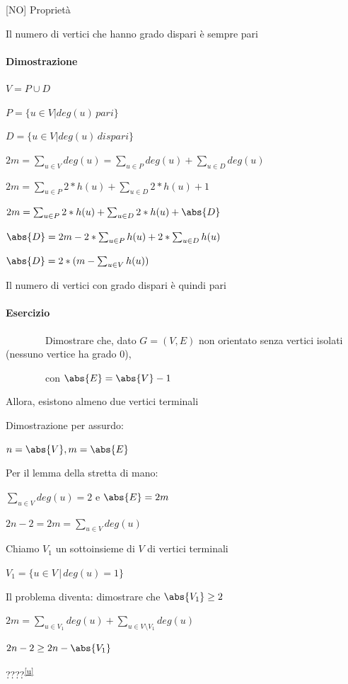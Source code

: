{{[}NO{]} Proprietà}

{Il numero di vertici che hanno grado dispari è sempre pari}

\paragraph{Dimostrazione}

$V=P\cup D$

$P = \{u \in V | deg(u) \, pari\}$

$D = \{u \in V | deg(u) \, dispari\}$

$2m = \sum_{u \in V}{deg(u)} = \sum_{u \in P}{deg(u)} + \sum_{u \in D}{deg(u)}$

$2m = \sum_{u \in P}{2*h(u)} + \sum_{u \in D}{2*h(u)+1}$

$2m = \sum_{u \in P}{2*h(u)} + \sum_{u \in D}{2*h(u)} + \abs{D}$

$\abs{D} = 2m - 2 *\sum_{u \in P}{h(u)} + 2*\sum_{u \in D}{h(u)}$

$\abs{D} = 2*(m-\sum_{u \in V}{h(u)})$

{Il numero di vertici con grado dispari è quindi pari}

\paragraph{Esercizio}
{~~~~~~~~Dimostrare che, dato $G=(V,E)$ non orientato senza vertici isolati (nessuno vertice ha grado 0),}

{~~~~~~~~con $\abs{E} = \abs{V} -1$}

{Allora, esistono almeno due vertici terminali}

{Dimostrazione per assurdo:}

$n=\abs{V},m=\abs{E}$

{Per il lemma della stretta di mano:}

$\sum_{u \in V}{deg(u)} = 2$ e $\abs{E} = 2m$

$2n-2 = 2m = \sum_{u \in V}{deg(u)}$

{Chiamo $V_1$ un sottoinsieme di $V$ di vertici terminali}

$V_1=\{u\in V\,|\,deg(u)=1\}$

{Il problema diventa: dimostrare che $\abs{V_1} \geq 2$}

$2m = \sum_{u \in V_1}{deg(u)} +  \sum_{u \in V \setminus V_1}{deg(u)}$

$2n -2 \geq 2n - \abs{V_1}$

{????}\textsuperscript{\protect\hyperlink{cmnt21}{{[}u{]}}}

